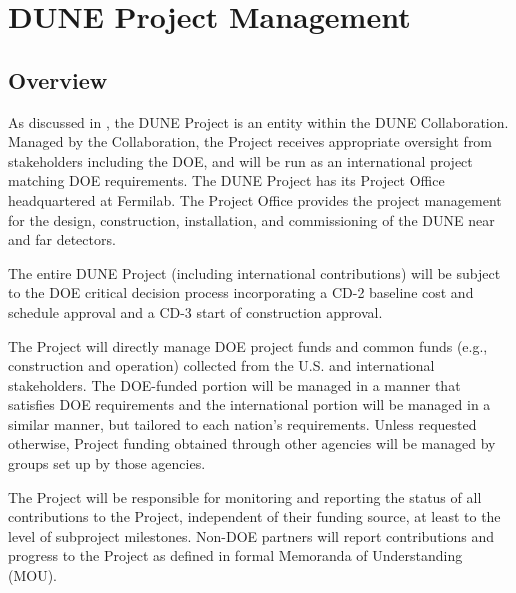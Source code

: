 \chapter{DUNE Project Management}
\label{ch:detectors-pm}

\section{Overview}




As discussed in \volintro,  the DUNE Project is an entity within the DUNE Collaboration. Managed by the Collaboration, the Project receives appropriate oversight from stakeholders including the DOE, and will be run as an international project matching DOE requirements. The DUNE Project has its Project Office headquartered at Fermilab.  
The Project Office provides the project management for the design, construction, installation, and commissioning of the DUNE near and far detectors. 

The entire DUNE Project (including international contributions)
will be subject to the DOE critical decision process incorporating a
CD-2 baseline cost and schedule approval and a CD-3 start of construction approval.

The Project will directly manage DOE project funds and 
common funds (e.g., construction and operation) collected from the
U.S. and international stakeholders. The DOE-funded portion will be managed in a
manner that satisfies DOE requirements and the international
portion will be managed in a similar manner, but tailored to each
nation's requirements. Unless requested otherwise,
Project funding obtained through other agencies will be managed
by groups set up by those agencies.

The Project will be responsible for monitoring and reporting 
the status of all contributions to the Project, independent of their
funding source, at least to the level of subproject milestones.
Non-DOE partners will report contributions and progress to the Project as defined in
formal Memoranda of Understanding (MOU).

